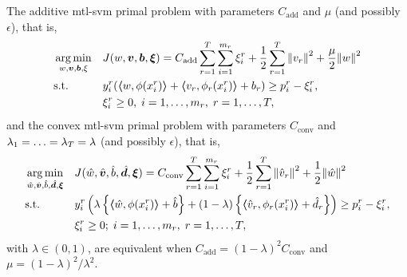 \begin{proposition}\label{prop:add_conv_equiv}
    The {additive} \acrshort{mtl}-\acrshort{svm} primal problem with parameters $C_\text{add}$ and $\mu$ (and possibly $\epsilon$), that is,
    \begin{equation}\label{eq:svmmtl_primal_add_equiv}
        \begin{aligned}
        & \argmin_{w, \fv{v}, \fv{b}, \xi}
        & & {J({w}, \fv{v}, \fv{b}, \fv{\xi}) = C_\text{add} \sum_{r= 1}^T \sum_{i=1}^{m_r} {\xi_{i}^r} + \frac{1}{2} \sum_{r= 1}^T{\norm{{v}_r}^2} + \frac{\mu}{2} {\norm{{w}}}^2} \\
        & \text{s.t.}
        & & y_{i}^r (\dotp{w}{\phi(x_{i}^r)}  + \dotp{{v}_r}{\phi_r(x_{i}^r)} + b_r) \geq p_{i}^r - \xi_{i}^r ,  \\
        & & & \xi_{i}^r \geq 0, \;  i=1 , \dotsc , m_r, \;  r= 1,\dotsc, T  , \\
        \end{aligned}
    \end{equation}
    and the {convex} \acrshort{mtl}-\acrshort{svm} primal problem with parameters $C_\text{conv}$ and $\lambda_1=\ldots=\lambda_T = \lambda$ (and possibly $\epsilon$), that is,
    \begin{equation}\label{eq:svmmtl_primal_convex_equiv}
        \begin{aligned}
        & \argmin_{\hat{w}, \hat{\fv{v}}, \hat{b}, \hat{\fv{d}}, \fv{\xi}}
        & & {J(\hat{w}, \hat{\fv{v}}, \hat{b}, \hat{\fv{d}}, \fv{\xi}) = C_\text{conv} \sum_{r= 1}^T \sum_{i=1}^{m_r} {\xi_{i}^r} + \frac{1}{2} \sum_{r= 1}^T{\norm{\hat{v}_r}^2} + \frac{1}{2} {\norm{\hat{w}}}^2} \\
        & \text{s.t.}
        & & y_{i}^r \left(\lambda \left\lbrace \dotp{\hat{w}}{\phi(x_{i}^r)} + \hat{b} \right\rbrace + (1 - \lambda) \left\lbrace \dotp{\hat{v}_r}{\phi_r(x_{i}^r)} + \hat{d}_r \right\rbrace  \right) \geq p_{i}^r - \xi_{i}^r ,  \\
        & & & \xi_{i}^r \geq 0; \;  i=1 , \dotsc , m_r, \;  r= 1,\dotsc, T  , \\
        \end{aligned}
    \end{equation}
    with $\lambda \in (0, 1)$, are equivalent when $C_\text{add} = (1 - \lambda)^2 C_\text{conv}$ and $\mu = (1 - \lambda)^2 / \lambda^2$.
    \label{thm_equiv}
\end{proposition}
